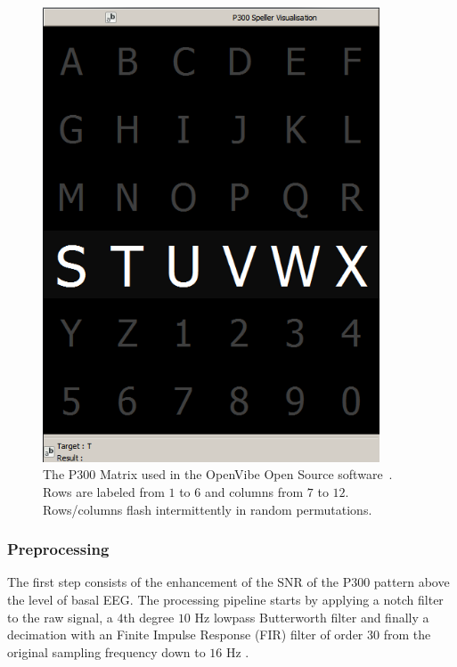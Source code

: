 \documentclass[entropy,article,submit,moreauthors,pdftex,10pt,a4paper]{mdpi}
\begin{document}
\begin{figure}[H]
\centering
\includegraphics[width=10cm]{openvibep300matrix.png}
\caption{The P300 Matrix used in the OpenVibe Open Source software~\citep{Renard2010}. Rows are labeled from $1$ to $6$ and columns from $7$ to $12$. Rows/columns flash intermittently in random permutations.}
\label{fig:p300matrix}
\end{figure}



\subsubsection{Preprocessing} \label{Preprocessing}

The first step consists of the enhancement of the SNR of the P300 pattern above the level of basal EEG. 
The processing pipeline starts by applying a notch filter to the raw signal, a 
$4$th degree $10$ Hz lowpass Butterworth filter and finally a decimation with an Finite Impulse Response (FIR) filter of order $30$ from the original sampling frequency down to $16$ Hz \citep{Krusienski2006}.
\end{document}
